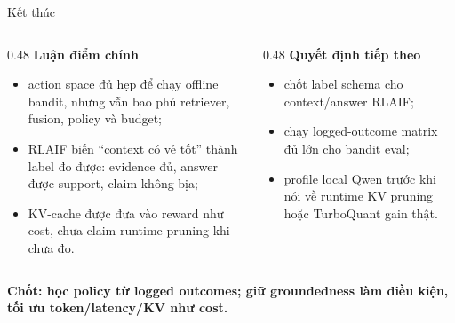 \documentclass[aspectratio=169,10pt]{beamer}
\newcommand{\minihead}[1]{{\bfseries\color{AccentDark}#1}}
\newenvironment{tightitemize}{\begin{itemize}\setlength{\itemsep}{0.22em}\setlength{\parskip}{0pt}}{\end{itemize}}
\begin{document}
\begin{frame}{Kết thúc}
  \small
  \begin{columns}[T,onlytextwidth]
    \begin{column}{0.48\textwidth}
      \minihead{Luận điểm chính}\\
      \begin{tightitemize}
        \item action space đủ hẹp để chạy offline bandit, nhưng vẫn bao phủ retriever, fusion, policy và budget;
        \item RLAIF biến ``context có vẻ tốt'' thành label đo được: evidence đủ, answer được support, claim không bịa;
        \item KV-cache được đưa vào reward như cost, chưa claim runtime pruning khi chưa đo.
      \end{tightitemize}
    \end{column}
    \begin{column}{0.48\textwidth}
      \minihead{Quyết định tiếp theo}\\
      \begin{tightitemize}
        \item chốt label schema cho context/answer RLAIF;
        \item chạy logged-outcome matrix đủ lớn cho bandit eval;
        \item profile local Qwen trước khi nói về runtime KV pruning hoặc TurboQuant gain thật.
      \end{tightitemize}
    \end{column}
  \end{columns}

  \vspace{0.55cm}
  \centering
  {\large\bfseries\color{AccentDark}
  Chốt: học policy từ logged outcomes; giữ groundedness làm điều kiện, tối ưu token/latency/KV như cost.}
\end{frame}

\appendix
\end{document}
